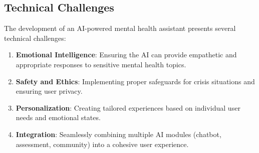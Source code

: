 \subsection{Technical Challenges}

The development of an AI-powered mental health assistant presents several technical challenges:

\begin{enumerate}
    \item \textbf{Emotional Intelligence}: Ensuring the AI can provide empathetic and appropriate responses to sensitive mental health topics.
    
    \item \textbf{Safety and Ethics}: Implementing proper safeguards for crisis situations and ensuring user privacy.
    
    \item \textbf{Personalization}: Creating tailored experiences based on individual user needs and emotional states.
    
    \item \textbf{Integration}: Seamlessly combining multiple AI modules (chatbot, assessment, community) into a cohesive user experience.
\end{enumerate} 